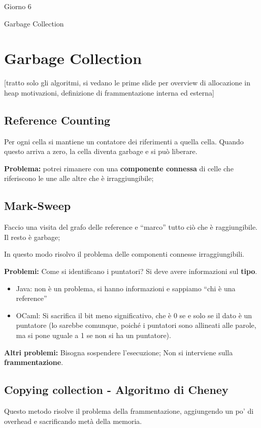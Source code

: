\documentclass[a4paper,10pt]{article}
\begin{document}
\begin{center}
    \LARGE Giorno 6\smallskip

    \Large Garbage Collection
\end{center}\smallskip


\section{Garbage Collection}
[tratto solo gli algoritmi, si vedano le prime slide per overview di allocazione in heap motivazioni, definizione di frammentazione interna ed esterna]

\subsection{Reference Counting}
Per ogni cella si mantiene un contatore dei riferimenti a quella cella. Quando questo arriva a zero, la cella diventa garbage e si può liberare.\smallskip

\textbf{Problema:} potrei rimanere con una \textbf{componente connessa} di celle che riferiscono le une alle altre che è irraggiungibile; 

\subsection{Mark-Sweep}
Faccio una visita del grafo delle reference e ``marco'' tutto ciò che è raggiungibile. Il resto è garbage;\smallskip

In questo modo risolvo il problema delle componenti connesse irraggiungibili.\smallskip

\textbf{Problemi:} Come si identificano i puntatori? Si deve avere informazioni sul \textbf{tipo}. 
\begin{itemize}
 \item Java: non è un problema, si hanno informazioni e sappiamo ``chi è una reference''
 \item OCaml: Si sacrifica il bit meno significativo, che è $0$ se e solo se il dato è un puntatore (lo sarebbe comunque, poiché i puntatori sono allineati alle parole, ma si pone uguale a 1 se non si ha un puntatore).
\end{itemize}

\textbf{Altri problemi:} Bisogna sospendere l'esecuzione; Non si interviene sulla \textbf{frammentazione}.

\subsection{Copying collection - Algoritmo di Cheney}
Questo metodo risolve il problema della frammentazione, aggiungendo un po' di overhead e sacrificando metà della memoria.\smallskip
\end{document}
